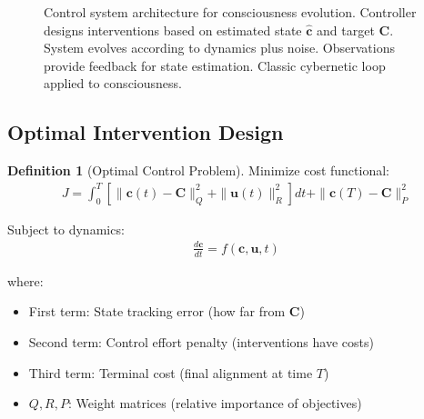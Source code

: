 \documentclass[11pt,a4paper]{article}
\theoremstyle{definition}
\newtheorem{definition}{Definition}[section]
\theoremstyle{remark}
\newcommand{\cc}{\mathbf{c}}
\begin{document}
\begin{enumerate}
\begin{figure}[H]
\caption{Control system architecture for consciousness evolution. Controller designs interventions based on estimated state \(\hat{\cc}\) and target \(\mathbf{C}\). System evolves according to dynamics plus noise. Observations provide feedback for state estimation. Classic cybernetic loop applied to consciousness.}
\label{fig:control_system}
\end{figure}

\subsection{Optimal Intervention Design}

\begin{definition}[Optimal Control Problem]
Minimize cost functional:
\begin{align}
J = \int_0^T \left[\|\cc(t) - \mathbf{C}\|_Q^2 + \|\mathbf{u}(t)\|_R^2\right] dt + \|\cc(T) - \mathbf{C}\|_P^2
\end{align}

Subject to dynamics:
\begin{align}
\frac{d\cc}{dt} = f(\cc, \mathbf{u}, t)
\end{align}

where:
\begin{itemize}
    \item First term: State tracking error (how far from \(\mathbf{C}\))
    \item Second term: Control effort penalty (interventions have costs)
    \item Third term: Terminal cost (final alignment at time \(T\))
    \item \(Q, R, P\): Weight matrices (relative importance of objectives)
\end{itemize}


\end{definition}
\end{enumerate}
\end{document}
